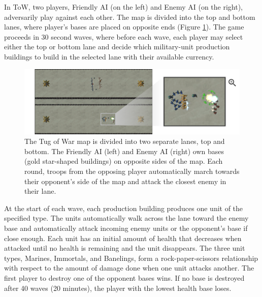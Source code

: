 \documentclass[letterpaper]{article} %
\begin{document}
In ToW, two players, Friendly AI (on the left) and Enemy AI (on the right), adversarily play against each other.
The map is divided into the top and bottom lanes, where player's bases are placed on opposite ends (Figure \ref{fig:ToW-ScreenShot}). The game proceeds in 30 second waves, where before each wave, each player may select either the top or bottom lane and decide which military-unit production buildings to build in the selected lane with their available currency. 

\begin{figure}[!tb]
    \centering
    \includegraphics[width=0.9\columnwidth]{images/domain/gamemap_rockpaperscissors.png}
    \vspace{-5pt}
    \caption{
    The Tug of War map is divided into two separate lanes, top and bottom.
    The Friendly AI (left) and Enemy AI (right) own bases (gold star-shaped buildings) on opposite sides of the map.
    Each round, troops from the opposing player automatically march towards their opponent's side of the map and attack the closest enemy in their lane. 
    }
    \label{fig:ToW-ScreenShot}
\end{figure}

At the start of each wave, each production building produces one unit of the specified type. The units automatically walk across the lane toward the enemy base and automatically attack incoming enemy units or the opponent's base if close enough. Each unit has an initial amount of health that decreases when attacked until no health is remaining and the unit disappears. The three unit types, Marines, Immortals, and Banelings, form a rock-paper-scissors relationship with respect to the amount of damage done when one unit attacks another. The first player to destroy one of the opponent bases wins. If no base is destroyed after 40 waves (20 minutes), the player with the lowest health base loses. 
\end{document}
